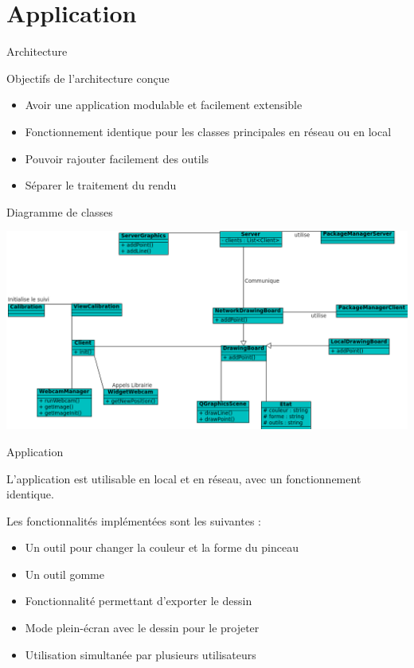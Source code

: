 \documentclass{beamer}
\begin{document}
	
	\section{Application}
		\begin{frame}{Architecture}
			\begin{block}{Objectifs de l'architecture conçue}
				\begin{itemize}
				\item{Avoir une application modulable et facilement extensible}
				\item{Fonctionnement identique pour les classes principales en réseau ou en local}
				\item{Pouvoir rajouter facilement des outils}
				\item{Séparer le traitement du rendu}
				\end{itemize}
			\end{block}
		\end{frame}
		
		\begin{frame}{Diagramme de classes}
			\begin{center}		
			\includegraphics[scale=0.45]{../uml/classes.png}
			\end{center}
		\end{frame}
		
		\begin{frame}{Application}
			
			L'application est utilisable en local et en réseau, avec un fonctionnement identique.
			
			Les fonctionnalités implémentées sont les suivantes :
			\begin{itemize}
			\item Un outil pour changer la couleur et la forme du pinceau
			\item Un outil gomme
			\item Fonctionnalité permettant d'exporter le dessin
			\item Mode plein-écran avec le dessin pour le projeter
			\item Utilisation simultanée par plusieurs utilisateurs
			\end{itemize}
		\end{frame}
		
\end{document}
